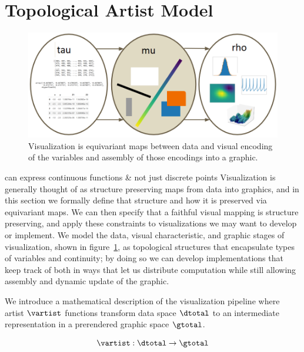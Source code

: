 \documentclass[../main.tex]{subfiles}
\begin{document}
\section{Topological Artist Model}
\label{sec:tam}
\begin{figure}[H]
    \includegraphics[width=\textwidth]{figures/math/dar.png}
    \caption{Visualization is equivariant maps between data and visual encoding of the variables and assembly of those encodings into a graphic.
    }
    \label{fig:artist_stages}
\end{figure}

can express continuous functions \& not just discrete points
Visualization is generally thought of as structure preserving maps from data into graphics, and in this section we formally define that structure and how it is preserved via equivariant maps. We can then specify that a faithful visual mapping is structure preserving, and apply these constraints to visualizations we may want to develop or implement. We model the data, visual characteristic, and graphic stages of visualization, shown in figure~\ref{fig:artist_stages}, as topological structures that encapsulate types of variables and continuity; by doing so we can develop implementations that keep track of both in ways that let us distribute computation while still allowing assembly and dynamic update of the graphic. 

We introduce a mathematical description of the visualization pipeline where artist $\mathscr{\vartist}$ functions transform data space $\mathscr{\dtotal}$ to an intermediate representation in a prerendered graphic space $\mathscr{\gtotal}$.

\begin{equation}
    \label{eq:artist}
    \mathscr{\vartist}: \mathscr{\dtotal} \rightarrow \mathscr{\gtotal}
\end{equation}
\end{document}
